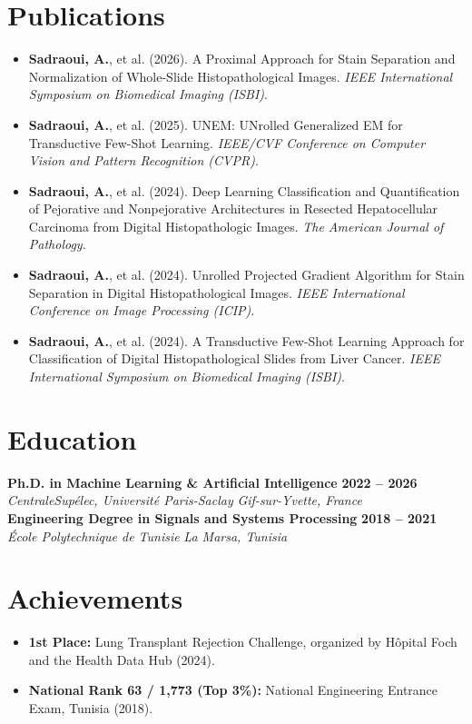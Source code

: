 \documentclass[10pt,a4paper]{article}
\newcommand{\resumeItem}[1]{\item #1}
\newenvironment{resumeItemize}{
  \begin{itemize}[leftmargin=12pt,itemsep=2pt,topsep=1pt,parsep=0pt,label=\textbullet]
}{
  \end{itemize}
}
\newcommand{\resumeEntry}[4]{
  \textbf{#1} \hfill \textbf{#2} \\
  \textit{#3} \hfill \textit{#4} \\[1pt]
}
\begin{document}


\newpage

\section*{Publications}
\begin{resumeItemize}
  \resumeItem{\textbf{Sadraoui, A.}, et al. (2026). A Proximal Approach for Stain Separation and Normalization of Whole-Slide Histopathological Images. \textit{IEEE International Symposium on Biomedical Imaging (ISBI)}.}
  \resumeItem{\textbf{Sadraoui, A.}, et al. (2025). UNEM: UNrolled Generalized EM for Transductive Few-Shot Learning. \textit{IEEE/CVF Conference on Computer Vision and Pattern Recognition (CVPR)}.}
  \resumeItem{\textbf{Sadraoui, A.}, et al. (2024). Deep Learning Classification and Quantification of Pejorative and Nonpejorative Architectures in Resected Hepatocellular Carcinoma from Digital Histopathologic Images. \textit{The American Journal of Pathology}.}
  \resumeItem{\textbf{Sadraoui, A.}, et al. (2024). Unrolled Projected Gradient Algorithm for Stain Separation in Digital Histopathological Images. \textit{IEEE International Conference on Image Processing (ICIP)}.}
  \resumeItem{\textbf{Sadraoui, A.}, et al. (2024). A Transductive Few-Shot Learning Approach for Classification of Digital Histopathological Slides from Liver Cancer. \textit{IEEE International Symposium on Biomedical Imaging (ISBI)}.}
\end{resumeItemize}

\section*{Education}
\resumeEntry{Ph.D. in Machine Learning \& Artificial Intelligence}{2022 -- 2026}{CentraleSupélec, Université Paris-Saclay}{Gif-sur-Yvette, France}
\resumeEntry{Engineering Degree in Signals and Systems Processing}{2018 -- 2021}{École Polytechnique de Tunisie}{La Marsa, Tunisia}

\section*{Achievements}
\begin{resumeItemize}
  \resumeItem{\textbf{1st Place:} Lung Transplant Rejection Challenge, organized by Hôpital Foch and the Health Data Hub (2024).}
  \resumeItem{\textbf{National Rank 63 / 1,773 (Top 3\%):} National Engineering Entrance Exam, Tunisia (2018).}
\end{resumeItemize}
\end{document}
